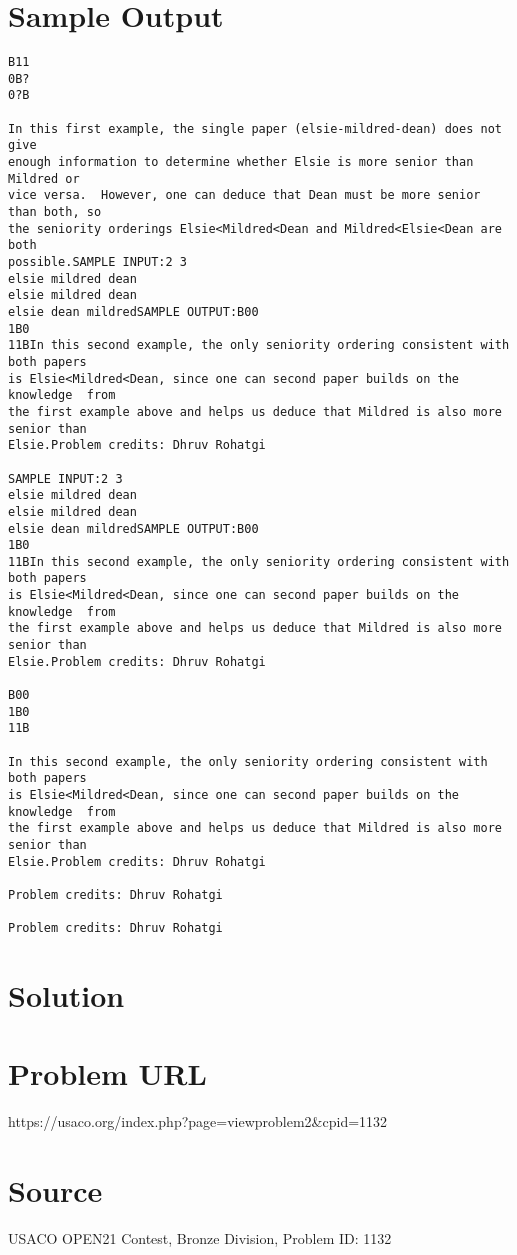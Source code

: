 \documentclass[12pt]{article}
\begin{document}
\section*{Sample Output}
\begin{verbatim}
B11
0B?
0?B

In this first example, the single paper (elsie-mildred-dean) does not give 
enough information to determine whether Elsie is more senior than Mildred or
vice versa.  However, one can deduce that Dean must be more senior than both, so
the seniority orderings Elsie<Mildred<Dean and Mildred<Elsie<Dean are both
possible.SAMPLE INPUT:2 3
elsie mildred dean
elsie mildred dean
elsie dean mildredSAMPLE OUTPUT:B00
1B0
11BIn this second example, the only seniority ordering consistent with both papers
is Elsie<Mildred<Dean, since one can second paper builds on the knowledge  from
the first example above and helps us deduce that Mildred is also more senior than
Elsie.Problem credits: Dhruv Rohatgi

SAMPLE INPUT:2 3
elsie mildred dean
elsie mildred dean
elsie dean mildredSAMPLE OUTPUT:B00
1B0
11BIn this second example, the only seniority ordering consistent with both papers
is Elsie<Mildred<Dean, since one can second paper builds on the knowledge  from
the first example above and helps us deduce that Mildred is also more senior than
Elsie.Problem credits: Dhruv Rohatgi

B00
1B0
11B

In this second example, the only seniority ordering consistent with both papers
is Elsie<Mildred<Dean, since one can second paper builds on the knowledge  from
the first example above and helps us deduce that Mildred is also more senior than
Elsie.Problem credits: Dhruv Rohatgi

Problem credits: Dhruv Rohatgi

Problem credits: Dhruv Rohatgi
\end{verbatim}

\section*{Solution}


\section*{Problem URL}
https://usaco.org/index.php?page=viewproblem2&cpid=1132

\section*{Source}
USACO OPEN21 Contest, Bronze Division, Problem ID: 1132
\end{document}
